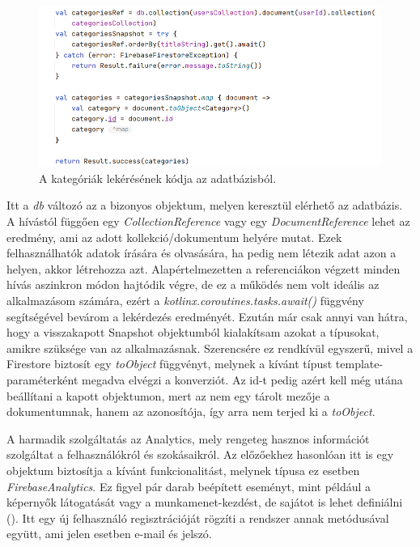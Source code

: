 \begin{figure}[!ht]
	\centering
	\includegraphics[width=150mm, keepaspectratio]{figures/firestore_query.png}
	\caption{A kategóriák lekérésének kódja az adatbázisból.}
	\label{fig:FirestoreQuery}
\end{figure}

Itt a \emph{db} változó az a bizonyos objektum, melyen keresztül elérhető az adatbázis. A hívástól függően egy \emph{CollectionReference} vagy egy \emph{DocumentReference} lehet az eredmény, ami az adott kollekció/dokumentum helyére mutat. Ezek felhasználhatók adatok írására és olvasására, ha pedig nem létezik adat azon a helyen, akkor létrehozza azt. Alapértelmezetten a referenciákon végzett minden hívás aszinkron módon hajtódik végre, de ez a működés nem volt ideális az alkalmazásom számára, ezért a \emph{kotlinx.coroutines.tasks.await()} függvény segítségével bevárom a lekérdezés eredményét. Ezután már csak annyi van hátra, hogy a visszakapott Snapshot objektumból kialakítsam azokat a típusokat, amikre szüksége van az alkalmazásnak. Szerencsére ez rendkívül egyszerű, mivel a Firestore biztosít egy \emph{toObject} függvényt, melynek a kívánt típust template-paraméterként megadva elvégzi a konverziót. Az id-t pedig azért kell még utána beállítani a kapott objektumon, mert az nem egy tárolt mezője a dokumentumnak, hanem az azonosítója, így arra nem terjed ki a \emph{toObject}.

A harmadik szolgáltatás az Analytics, mely rengeteg hasznos információt szolgáltat a felhasználókról és szokásaikról. Az előzőekhez hasonlóan itt is egy objektum biztosítja a kívánt funkcionalitást, melynek típusa ez esetben \emph{FirebaseAnalytics}. Ez figyel pár darab beépített eseményt, mint például a képernyők látogatását vagy a munkamenet-kezdést, de sajátot is lehet definiálni (). Itt egy új felhasználó regisztrációját rögzíti a rendszer annak metódusával együtt, ami jelen esetben e-mail és jelszó. 

